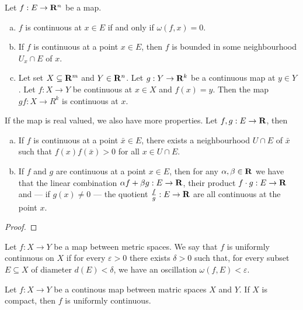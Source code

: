 \begin{proposition}
Let \(f: E \to \mathbf{R}^n\) be a map.
\begin{enumerate}[(a)]
\item \(f\) is continuous at \(x \in E\) if and only if \(\omega(f, x) =
    0\).
\item If \(f\) is continuous at a point \(x \in E\), then \(f\) is bounded
    in some neighbourhood \(U_x \cap E\) of \(x\).
\item Let set \(X \subseteq \mathbf{R}^m\) and \(Y \in \mathbf{R}^n\). Let \(g: Y \to \mathbf{R}^k\)
    be a continuous map at \(y \in Y\). Let \(f: X \to Y\) be continuous at
    \(x \in X\) and \(f(x) = y\). Then the map \(g  f: X \to R^k\) is
    continuous at \(x\).
\end{enumerate}
If the map is real valued, we also have more properties. Let \(f, g: E \to
\mathbf{R}\), then
\begin{enumerate}[(a)]
\item If \(f\) is continuous at a point \(\bar x \in E\), there exists a
    neighbourhood \(U \cap E\) of \(\bar x\) such that \(f(x)f(\bar x) > 0\)
    for all \(x \in U \cap E\).
\item If \(f\) and \(g\) are continuous at a point \(x \in E\), then for any
    \(\alpha, \beta \in \mathbf{R}\) we have that the linear combination \(\alpha f +
    \beta g: E \to \mathbf{R}\), their product \(f \cdot g: E \to \mathbf{R}\) and --- if \(g(x)
    \neq 0\) --- the quotient \(\frac f g: E \to \mathbf{R}\) are all continuous at
    the point \(x\).
\end{enumerate}
\end{proposition}

\begin{proof}
\end{proof}

\begin{definition}\label{def:uniformly-continuous}
Let \(f: X \to Y\) be a map between metric spaces. We say that \(f\) is
uniformly continuous on \(X\) if for every \(\varepsilon > 0\) there exists
\(\delta > 0\) such that, for every subset \(E \subseteq X\) of diameter \(d(E)
< \delta\), we have an oscillation \(\omega(f, E) < \varepsilon\).
\end{definition}

\begin{theorem}
\label{thm:heine-cantor}
Let \(f: X \to Y\) be a continous map between matric spaces \(X\) and \(Y\). If
\(X\) is compact, then \(f\) is uniformly continuous.
\end{theorem}


